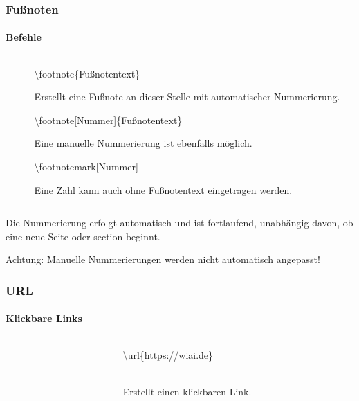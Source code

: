 \begin{frame}
\frametitle{Fu\ss noten}
\framesubtitle{Befehle}
\begin{columns}
\begin{column}{0.5\textwidth}
\begin{ttfamily}\scriptsize

\end{ttfamily}
\end{column}
\begin{column}{0.5\textwidth}
\begin{ttfamily}\color{nounibaredI}\textbackslash footnote\color{black}\{Fu\ss notentext\}\end{ttfamily} Erstellt eine Fußnote an dieser Stelle mit automatischer Nummerierung.

\begin{ttfamily}\color{nounibaredI}\textbackslash footnote\color{nounibagreenI}[Nummer]\color{black}\{Fu\ss notentext\}\end{ttfamily} Eine manuelle Nummerierung ist ebenfalls möglich. 

\begin{ttfamily}\color{nounibaredI}\textbackslash footnotemark\color{nounibagreenI}[Nummer]\color{black}\end{ttfamily}
Eine Zahl kann auch ohne Fußnotentext eingetragen werden.
\end{column}
\end{columns}
\bigskip
Die Nummerierung erfolgt automatisch und ist fortlaufend, unabhängig davon, ob
eine neue Seite oder {\ttfamily section} beginnt.\\[1mm]
\begin{alertblock}{Achtung:}
Manuelle Nummerierungen werden nicht automatisch angepasst!
\end{alertblock}
\vspace{-0.5cm}
\end{frame}


\begin{frame}
\frametitle{URL}
\framesubtitle{Klickbare Links}
\begin{columns}
\begin{column}{0.5\textwidth}
\begin{ttfamily}\footnotesize

\end{ttfamily}
\end{column}
\begin{column}{0.5\textwidth}
\begin{ttfamily}\color{nounibaredI}\textbackslash url\color{black}\{https://wiai.de\}\end{ttfamily}\\ 
Erstellt einen klickbaren Link.
\bigskip
\end{column}
\end{columns}
\end{frame}